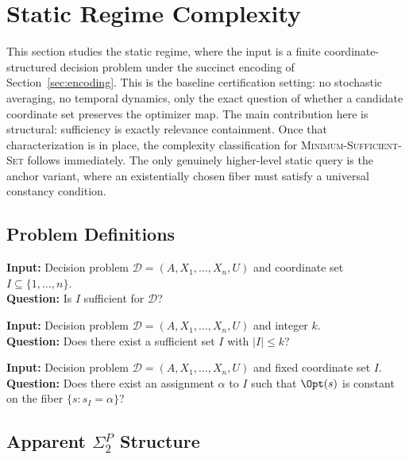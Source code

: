 \section{Static Regime Complexity}\label{sec:hardness}

This section studies the static regime, where the input is a finite coordinate-structured decision problem under the succinct encoding of Section~\ref{sec:encoding}. This is the baseline certification setting: no stochastic averaging, no temporal dynamics, only the exact question of whether a candidate coordinate set preserves the optimizer map. The main contribution here is structural: sufficiency is exactly relevance containment. Once that characterization is in place, the complexity classification for \textsc{Minimum-Sufficient-Set} follows immediately. The only genuinely higher-level static query is the anchor variant, where an existentially chosen fiber must satisfy a universal constancy condition.

\subsection{Problem Definitions}

\begin{problem}
\textbf{Input:} Decision problem $\mathcal{D}=(A,X_1,\ldots,X_n,U)$ and coordinate set $I \subseteq \{1,\ldots,n\}$. \\
\textbf{Question:} Is $I$ sufficient for $\mathcal{D}$?
\end{problem}

\begin{problem}
\textbf{Input:} Decision problem $\mathcal{D}=(A,X_1,\ldots,X_n,U)$ and integer $k$. \\
\textbf{Question:} Does there exist a sufficient set $I$ with $|I| \le k$?
\end{problem}

\begin{problem}
\textbf{Input:} Decision problem $\mathcal{D}=(A,X_1,\ldots,X_n,U)$ and fixed coordinate set $I$. \\
\textbf{Question:} Does there exist an assignment $\alpha$ to $I$ such that $\Opt(s)$ is constant on the fiber $\{s : s_I=\alpha\}$?
\end{problem}

\subsection{Apparent $\Sigma_2^P$ Structure}

